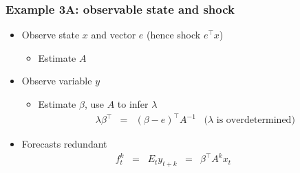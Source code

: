 \documentclass{beamer}
\begin{document}
\begin{frame}
\frametitle{Example 3A: observable state and shock}
\begin{itemize}  \itemsep=\bigskipamount
\item Observe state $x$ and vector $e$ (hence shock $e^\top x$)\\
\begin{itemize}
\item Estimate $A$ \;
\end{itemize}
\item Observe variable $y$ \\
\begin{itemize}
\item Estimate $\beta$, use $A$ to infer $\lambda$
\begin{eqnarray*}
    \lambda \beta^\top &=& (\beta - e)^\top A^{-1}
     \;\;\; (\lambda \mbox { is overdetermined)}
\end{eqnarray*}

\end{itemize}
\item Forecasts redundant
\begin{eqnarray*}
    f^k_t \;\;=\;\; E_t y_{t+k} &=& \beta^\top A^k x_t \phantom{xxxxx}
\end{eqnarray*}
\end{itemize}
\end{frame}
\end{document}
